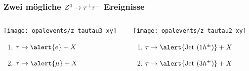 \begin{frame}
   \frametitle{Zwei m\"ogliche $Z^{0}\rightarrow\tau^{+}\tau^{-}$ Ereignisse}
   \begin{columns}
     \begin{column}{0.5\textwidth}
      \centering
       \texttt{[image: opalevents/z\_tautau3\_xy]}
       \pause
       \begin{enumerate}
       \item $\tau \rightarrow \alert{e} + X$
       \item $\tau \rightarrow \alert{\mu} + X$
       \end{enumerate}
     \end{column}
     \begin{column}{0.5\textwidth}
      \centering
      \pause
       \texttt{[image: opalevents/z\_tautau2\_xy]}
       \pause
       \begin{enumerate}
       \item $\tau \rightarrow \alert{\text{Jet }(1h^{\pm})} + X$
       \item $\tau \rightarrow \alert{\text{Jet }(3h^{\pm})} + X$
       \end{enumerate}
     \end{column}
   \end{columns}
 \end{frame}

